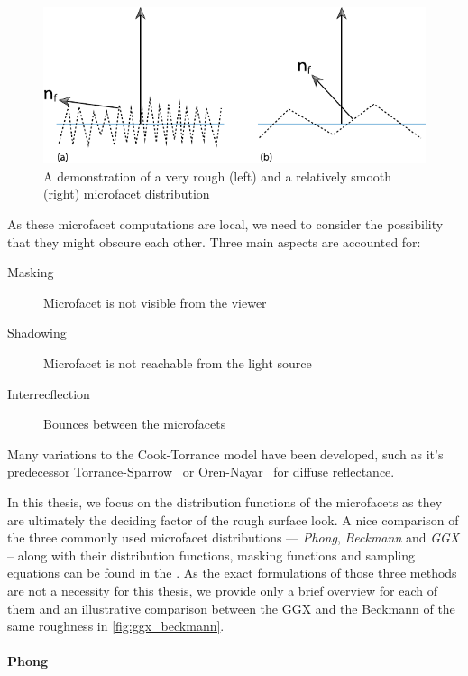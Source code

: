 \begin{figure}[h]
	\centering
	\includegraphics[width=.8\linewidth]{img/microfacets.pdf}
	\caption{A demonstration of a very rough (left) and a relatively smooth (right) microfacet distribution~\cite{pharr2016physically}}
	\label{fig:microfacets}
\end{figure}

As these microfacet computations are local, we need to consider the possibility that they might obscure each other. Three main aspects are accounted for:
\begin{description}
	\item[Masking] Microfacet is not visible from the viewer
	\item[Shadowing] Microfacet is not reachable from the light source
	\item[Interrecflection] Bounces between the microfacets
\end{description}

Many variations to the Cook-Torrance model have been developed, such as it's predecessor Torrance-Sparrow~\cite{Torrance1967TheoryFO} or Oren-Nayar~\cite{oren1994generalization} for diffuse reflectance.

In this thesis, we focus on the distribution functions of the microfacets as they are ultimately the deciding factor of the rough surface look. A nice comparison of the three commonly used microfacet distributions --- \emph{Phong}, \emph{Beckmann} and \emph{GGX} -- along with their distribution functions, masking functions and sampling equations can be found in the \citet{walter2007microfacet}. As the exact formulations of those three methods are not a necessity for this thesis, we provide only a brief overview for each of them and an illustrative comparison between the GGX and the Beckmann of the same roughness in 
\autoref{fig:ggx_beckmann}.

\paragraph{Phong}

